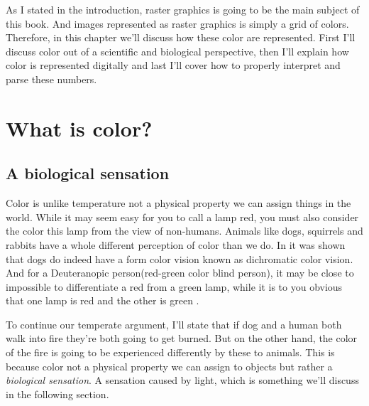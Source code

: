 



As I stated in the introduction, raster graphics is going to be the
main subject of this book. And images represented as raster graphics
is simply a grid of colors. Therefore, in this chapter we'll discuss
how these color are represented. First I'll discuss color out of a
scientific and biological perspective, then I'll explain how color is
represented digitally and last I'll cover how to properly interpret
and parse these numbers.

\section{What is color?}

\subsection{A biological sensation}

\newcommand{\bluewave}{\ensuremath{\SI{400}{\nano\meter}}}

Color is unlike temperature not a physical property we can assign
things in the world. While it may seem easy for you to call a lamp
red, you must also consider the color this lamp from the view of
non-humans. Animals like dogs, squirrels and rabbits have a whole
different perception of color than we do. In \cite{dog_color_vision}
it was shown that dogs do indeed have a form color vision known as
dichromatic color vision. And for a Deuteranopic person(red-green
color blind person), it may be close to impossible to differentiate a
red from a green lamp, while it is to you obvious that one lamp is red
and the other is green
\cite{thompson:ways_of_coloring,schanda97:_colorimetry}.

To continue our temperate argument, I'll state that if dog and a human
both walk into fire they're both going to get burned. But on the other
hand, the color of the fire is going to be experienced differently by
these to animals. This is because color not a physical property we can
assign to objects but rather a \textit{biological
  sensation}\cite{boutel:_png_portab_networ_graph_specif_version12}. A
sensation caused by light, which is something we'll discuss in the
following section.

